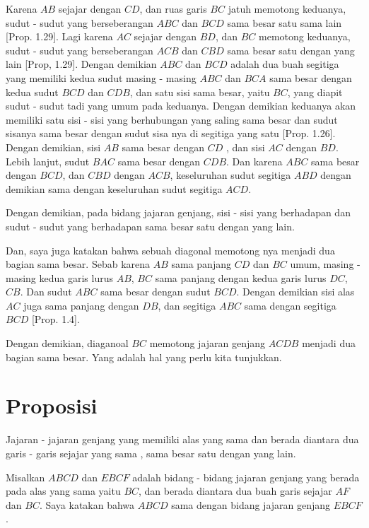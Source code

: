 \documentclass[a4paper]{book}
\begin{document}
Karena $AB$ sejajar dengan $CD$, dan ruas garis $BC$ jatuh memotong keduanya, 
sudut - sudut yang berseberangan $ABC$ dan $BCD$ sama besar satu sama lain 
[Prop. 1.29]. Lagi karena $AC$ sejajar dengan $BD$, dan $BC$ memotong keduanya, 
sudut - sudut yang berseberangan $ACB$ dan $CBD$ sama besar satu 
dengan yang lain [Prop, 1.29]. Dengan demikian $ABC$ dan $BCD$ adalah dua buah 
segitiga yang memiliki kedua sudut masing - masing $ABC$ dan $BCA$ sama besar 
dengan kedua sudut $BCD$ dan $CDB$, dan satu sisi sama besar, yaitu $BC$, yang
diapit sudut - sudut  tadi yang umum pada keduanya.
Dengan demikian keduanya akan memiliki satu sisi - sisi yang berhubungan yang saling
sama besar dan sudut sisanya sama besar dengan sudut sisa nya di segitiga yang satu
[Prop. 1.26].  Dengan demikian, sisi $AB$ sama besar dengan $CD$ , dan sisi 
$AC$ dengan $BD$. Lebih lanjut, sudut $BAC$ sama besar
dengan $CDB$. Dan karena $ABC$ sama besar dengan $BCD$, dan $CBD$ dengan $ACB$, 
keseluruhan sudut segitiga $ABD$ dengan demikian sama dengan keseluruhan  sudut 
segitiga $ACD$.

Dengan demikian, pada bidang jajaran genjang, sisi - sisi yang berhadapan dan
sudut - sudut yang berhadapan sama besar satu dengan yang lain.

Dan, saya juga katakan bahwa sebuah diagonal memotong nya menjadi dua bagian 
sama besar. Sebab karena $AB$ sama panjang $CD$ dan $BC$ umum, masing - masing 
kedua garis lurus $AB$, $BC$ sama panjang dengan kedua garis lurus $DC$, $CB$. 
Dan sudut $ABC$ sama besar dengan sudut $BCD$. Dengan demikian sisi alas $AC$ 
juga sama panjang dengan $DB$, dan segitiga $ABC$ sama dengan segitiga $BCD$ 
[Prop. 1.4].

Dengan demikian, diaganoal $BC$ memotong jajaran genjang $ACDB$ menjadi dua 
bagian sama besar. Yang adalah hal yang perlu kita tunjukkan.

\section*{\centering Proposisi \thesection} 
Jajaran - jajaran genjang yang memiliki alas yang sama dan berada diantara dua
garis - garis sejajar yang sama , sama besar satu dengan yang lain.  

\begin{center}
\end{center} 
Misalkan $ABCD$ dan $EBCF$ adalah bidang - bidang jajaran genjang yang berada
pada  alas yang sama yaitu $BC$, dan berada diantara dua buah garis sejajar 
$AF$ dan $BC$. Saya katakan bahwa $ABCD$ sama dengan bidang jajaran genjang 
$EBCF$.
\end{document}

